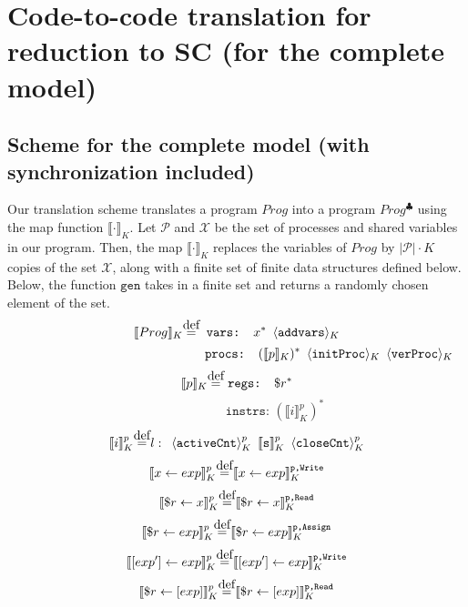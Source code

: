 \documentclass{article}
\newcommand\myeq{\stackrel{\mathclap{\normalfont\mbox{def}}}{=}}
\begin{document}
\section{Code-to-code translation for reduction to SC (for the complete model)}
\subsection{Scheme for the complete model (with synchronization included)}
Our translation scheme translates a program $Prog$ into a program $Prog^\clubsuit$ using the map function $\llbracket\cdot\rrbracket_K$. Let $\mathcal{P}$ and $\mathcal{X}$ be the set of processes and shared variables in our program. Then, the map $\llbracket\cdot\rrbracket_K$ replaces the variables of $Prog$ by $|\mathcal{P}|\cdot K$ copies of the set $\mathcal{X}$, along with a finite set of finite data structures defined below. Below, the function $\texttt{gen}$ takes in a finite set and returns a randomly chosen element of the set.\\
$$\llbracket Prog \rrbracket_K \myeq \texttt{ vars: }x^* \hspace{0.5em} \langle \texttt{addvars} \rangle_K$$
\vspace{-2em}
$$\qquad\qquad\qquad\qquad\kern 6.5em\texttt{procs: }(\llbracket p \rrbracket_K)^* \kern 0.5em \langle \texttt{initProc} \rangle_K \kern 0.5em \langle \texttt{verProc} \rangle_K$$
$$\llbracket p \rrbracket_K \myeq \;\texttt{regs: } \$r^*$$
\vspace{-2em}
$$\qquad\qquad\qquad\texttt{instrs: } (\llbracket i \rrbracket_K^p)^*$$
$$\llbracket i \rrbracket_K^p \myeq l: \kern 0.5em \langle \texttt{activeCnt} \rangle_K^p \kern 0.5em \llbracket \texttt{s} \rrbracket_K^p \kern 0.5em \langle \texttt{closeCnt} \rangle_K^p$$
$$\llbracket x \leftarrow exp \rrbracket_K^p \myeq \llbracket x \leftarrow exp \rrbracket_K^\texttt{p,Write}$$ 
\vspace{-1.2em}
$$\llbracket \$r \leftarrow x \rrbracket_K^p \myeq \llbracket \$r \leftarrow x \rrbracket_K^\texttt{p,Read}$$
\vspace{-1.2em}
$$\llbracket \$r \leftarrow exp \rrbracket_K^p \myeq \llbracket \$r \leftarrow exp \rrbracket_K^\texttt{p,Assign} $$
\vspace{-1.2em}
$$\llbracket [exp'] \leftarrow exp \rrbracket_K^p \myeq \llbracket [exp'] \leftarrow exp \rrbracket_K^\texttt{p,Write}$$
\vspace{-1.2em}
$$\llbracket \$r \leftarrow [exp] \rrbracket_K^p \myeq \llbracket \$r \leftarrow [exp] \rrbracket_K^\texttt{p,Read}$$
\end{document}
